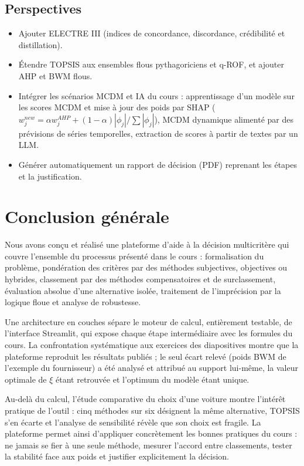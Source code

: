 \documentclass[11pt,a4paper]{report}
\theoremstyle{definition}
\theoremstyle{remark}
\begin{document}
\section{Perspectives}
\begin{itemize}
  \item Ajouter ELECTRE III (indices de concordance, discordance, crédibilité et distillation).
  \item Étendre TOPSIS aux ensembles flous pythagoriciens et q-ROF, et ajouter AHP et BWM flous.
  \item Intégrer les scénarios \og MCDM et IA \fg{} du cours : apprentissage d'un modèle sur les scores MCDM
        et mise à jour des poids par SHAP ($w_j^{new}=\alpha w_j^{AHP}+(1-\alpha)|\phi_j|/\sum|\phi_j|$),
        MCDM dynamique alimenté par des prévisions de séries temporelles, extraction de scores à partir de
        textes par un LLM.
  \item Générer automatiquement un rapport de décision (PDF) reprenant les étapes et la justification.
\end{itemize}

\chapter*{Conclusion générale}

Nous avons conçu et réalisé une plateforme d'aide à la décision multicritère qui couvre l'ensemble du
processus présenté dans le cours : formalisation du problème, pondération des critères par des méthodes
subjectives, objectives ou hybrides, classement par des méthodes compensatoires et de surclassement,
évaluation absolue d'une alternative isolée, traitement de l'imprécision par la logique floue et analyse de
robustesse.

Une architecture en couches sépare le moteur de calcul, entièrement testable, de l'interface Streamlit, qui
expose chaque étape intermédiaire avec les formules du cours. La confrontation systématique aux exercices
des diapositives montre que la plateforme reproduit les résultats publiés ; le seul écart relevé (poids BWM
de l'exemple du fournisseur) a été analysé et attribué au support lui-même, la valeur optimale de $\xi$ étant
retrouvée et l'optimum du modèle étant unique.

Au-delà du calcul, l'étude comparative du choix d'une voiture montre l'intérêt pratique de l'outil : cinq
méthodes sur six désignent la même alternative, TOPSIS s'en écarte et l'analyse de sensibilité révèle que
son choix est fragile. La plateforme permet ainsi d'appliquer concrètement les bonnes pratiques du cours :
ne jamais se fier à une seule méthode, mesurer l'accord entre classements, tester la stabilité face aux
poids et justifier explicitement la décision.
\end{document}
